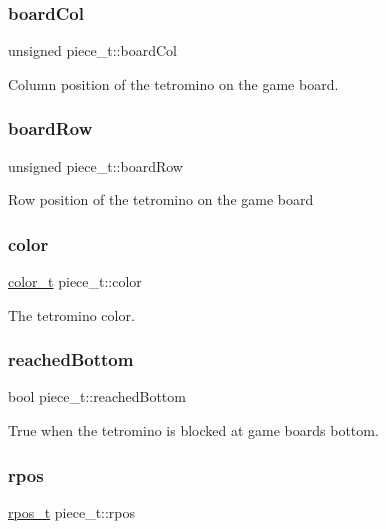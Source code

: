 \subsubsection{\texorpdfstring{board\+Col}{boardCol}}
{\footnotesize\ttfamily unsigned piece\+\_\+t\+::board\+Col}

Column position of the tetromino on the game board. \mbox{\label{structpiece__t_a14640fd68c44e80eacbe6adbf8597829}} 
\subsubsection{\texorpdfstring{board\+Row}{boardRow}}
{\footnotesize\ttfamily unsigned piece\+\_\+t\+::board\+Row}

Row position of the tetromino on the game board \mbox{\label{structpiece__t_af6408bda8899430d6457a83afb657225}} 
\subsubsection{\texorpdfstring{color}{color}}
{\footnotesize\ttfamily \hyperlink{TetreesDefs_8hpp_a8ba5fbce2446135735693ab60c896bbd}{color\+\_\+t} piece\+\_\+t\+::color}

The tetromino color. \mbox{\label{structpiece__t_acb67c9322e157b7dd7c7e0efd212da76}} 
\subsubsection{\texorpdfstring{reached\+Bottom}{reachedBottom}}
{\footnotesize\ttfamily bool piece\+\_\+t\+::reached\+Bottom}

True when the tetromino is blocked at game board\textquotesingle{}s bottom. \mbox{\label{structpiece__t_ab1d715c35231b557560096e2d79f4a43}} 
\subsubsection{\texorpdfstring{rpos}{rpos}}
{\footnotesize\ttfamily \hyperlink{TetreesDefs_8hpp_ae8c3bf9765f183eabf1106110513afc6}{rpos\+\_\+t} piece\+\_\+t\+::rpos}


